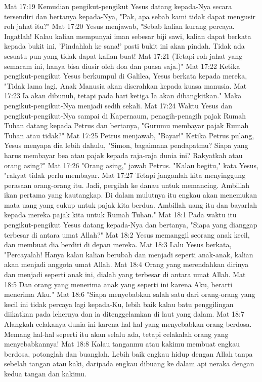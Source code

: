 Mat 17:19  Kemudian pengikut-pengikut Yesus datang kepada-Nya secara tersendiri dan bertanya kepada-Nya, "Pak, apa sebab kami tidak dapat mengusir roh jahat itu?"
Mat 17:20  Yesus menjawab, "Sebab kalian kurang percaya. Ingatlah! Kalau kalian mempunyai iman sebesar biji sawi, kalian dapat berkata kepada bukit ini, 'Pindahlah ke sana!' pasti bukit ini akan pindah. Tidak ada sesuatu pun yang tidak dapat kalian buat!
Mat 17:21  (Tetapi roh jahat yang semacam ini, hanya bisa diusir oleh doa dan puasa saja.)"
Mat 17:22  Ketika pengikut-pengikut Yesus berkumpul di Galilea, Yesus berkata kepada mereka, "Tidak lama lagi, Anak Manusia akan diserahkan kepada kuasa manusia.
Mat 17:23  Ia akan dibunuh, tetapi pada hari ketiga Ia akan dibangkitkan." Maka pengikut-pengikut-Nya menjadi sedih sekali.
Mat 17:24  Waktu Yesus dan pengikut-pengikut-Nya sampai di Kapernaum, penagih-penagih pajak Rumah Tuhan datang kepada Petrus dan bertanya, "Gurumu membayar pajak Rumah Tuhan atau tidak?"
Mat 17:25  Petrus menjawab, "Bayar!" Ketika Petrus pulang, Yesus menyapa dia lebih dahulu, "Simon, bagaimana pendapatmu? Siapa yang harus membayar bea atau pajak kepada raja-raja dunia ini? Rakyatkah atau orang asing?"
Mat 17:26  "Orang asing," jawab Petrus. "Kalau begitu," kata Yesus, "rakyat tidak perlu membayar.
Mat 17:27  Tetapi janganlah kita menyinggung perasaan orang-orang itu. Jadi, pergilah ke danau untuk memancing. Ambillah ikan pertama yang kautangkap. Di dalam mulutnya itu engkau akan menemukan mata uang yang cukup untuk pajak kita berdua. Ambillah uang itu dan bayarlah kepada mereka pajak kita untuk Rumah Tuhan."
Mat 18:1  Pada waktu itu pengikut-pengikut Yesus datang kepada-Nya dan bertanya, "Siapa yang dianggap terbesar di antara umat Allah?"
Mat 18:2  Yesus memanggil seorang anak kecil, dan membuat dia berdiri di depan mereka.
Mat 18:3  Lalu Yesus berkata, "Percayalah! Hanya kalau kalian berubah dan menjadi seperti anak-anak, kalian akan menjadi anggota umat Allah.
Mat 18:4  Orang yang merendahkan dirinya dan menjadi seperti anak ini, dialah yang terbesar di antara umat Allah.
Mat 18:5  Dan orang yang menerima anak yang seperti ini karena Aku, berarti menerima Aku."
Mat 18:6  "Siapa menyebabkan salah satu dari orang-orang yang kecil ini tidak percaya lagi kepada-Ku, lebih baik kalau batu penggilingan diikatkan pada lehernya dan ia ditenggelamkan di laut yang dalam.
Mat 18:7  Alangkah celakanya dunia ini karena hal-hal yang menyebabkan orang berdosa. Memang hal-hal seperti itu akan selalu ada, tetapi celakalah orang yang menyebabkannya!
Mat 18:8  Kalau tanganmu atau kakimu membuat engkau berdosa, potonglah dan buanglah. Lebih baik engkau hidup dengan Allah tanpa sebelah tangan atau kaki, daripada engkau dibuang ke dalam api neraka dengan kedua tangan dan kakimu.
